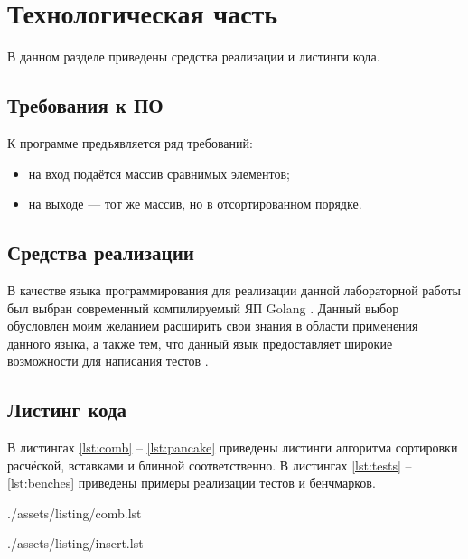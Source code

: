 \chapter{Технологическая часть}

В данном разделе приведены средства реализации и листинги кода.

\section{Требования к ПО}

К программе предъявляется ряд требований:
\begin{itemize}
	\item на вход подаётся массив сравнимых элементов;
	\item на выходе — тот же массив, но в отсортированном порядке.
\end{itemize}

\section{Средства реализации}

В качестве языка программирования для реализации данной лабораторной работы был выбран современный компилируемый ЯП Golang \cite{rustlang}. Данный выбор обусловлен моим желанием расширить свои знания в области применения данного языка, а также тем, что данный язык предоставляет широкие возможности для написания тестов \cite{rusttest}.

\section{Листинг кода}

В листингах \ref{lst:comb} -- \ref{lst:pancake} приведены листинги алгоритма сортировки расчёской, вставками и блинной соответственно. В листингах \ref{lst:tests} -- \ref{lst:benches} приведены примеры реализации тестов и бенчмарков.

\clearpage
\begin{lstinputlisting}[
	caption={Алгоритм сортировки расчёской},
	label={lst:comb},
	style={golang}
]{./assets/listing/comb.lst}
\end{lstinputlisting}

\begin{lstinputlisting}[
	caption={Алгоритм сортировки вставками},
	label={lst:insert},
	style={golang}
]{./assets/listing/insert.lst}
\end{lstinputlisting}

